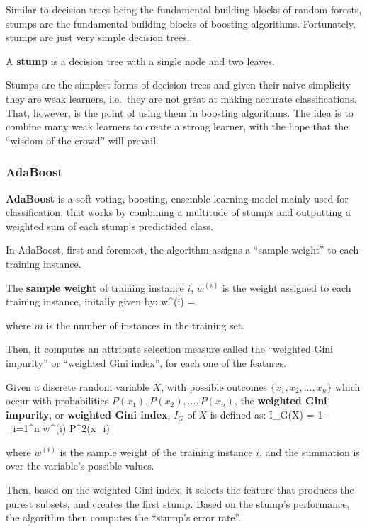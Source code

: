 Similar to decision trees being the fundamental building blocks of random forests, stumps are the fundamental building
blocks of boosting algorithms. Fortunately, stumps are just very simple decision trees.

\bd[Stump]
A \textbf{stump} is a decision tree with a single node and two leaves.
\ed

Stumps are the simplest forms of decision trees and given their naive simplicity they are weak learners, i.e.\ they are
not great at making accurate classifications. That, however, is the point of using them in boosting algorithms. The
idea is to combine many weak learners to create a strong learner, with the hope that the ``wisdom of the crowd'' will
prevail.

\subsubsection{AdaBoost}

\bd[AdaBoost]
\textbf{AdaBoost} is a soft voting, boosting, ensemble learning model mainly used for classification, that works by
combining a multitude of stumps and outputting a weighted sum of each stump's predictided class.
\ed

In AdaBoost, first and foremost, the algorithm assigns a ``sample weight'' to each training instance.

The \textbf{sample weight} of training instance $i$, $w^{(i)}$ is the weight assigned to each training instance,
initally given by:
\bse
w^{(i)} = 
\ese

where $m$ is the number of instances in the training set.
\ed

Then, it computes an attribute selection measure called the ``weighted Gini impurity'' or ``weighted Gini index'',
for each one of the features.

Given a discrete random variable $X$, with possible outcomes $\{x_{1}, x_{2}, \ldots, x_{n} \}$ which occur with
probabilities $ P(x_{1}), P(x_{2}), \ldots, P(x_{n})$, the \textbf{weighted Gini impurity}, or \textbf{weighted Gini
index}, $I_{G}$ of $X$ is defined as:
\bse
I_{G}(X) = 1 - \sum _{i=1}^{n} w^{(i)} P^2(x_{i})
\ese

where $w^{(i)}$ is the sample weight of the training instance $i$, and the summation is over the variable's possible
values.
\ed

Then, based on the weighted Gini index, it selects the feature that produces the purest subsets, and creates the
first stump. Based on the stump's performance, the algorithm then computes the ``stump's error rate''.

